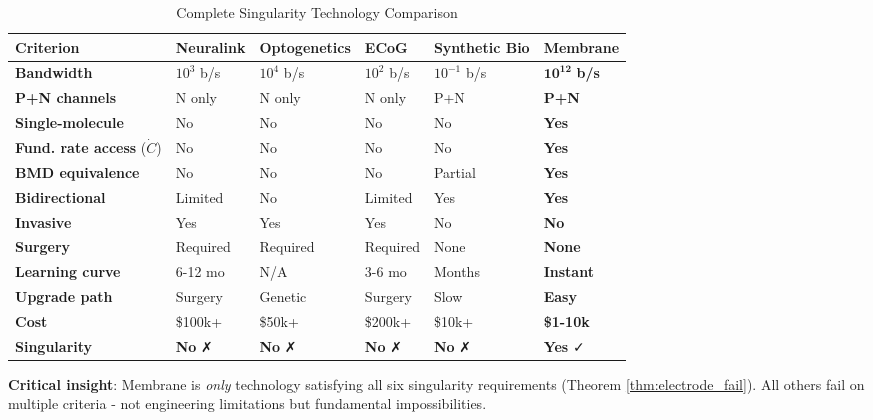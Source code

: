 \documentclass[11pt,a4paper]{article}
\theoremstyle{definition}
\theoremstyle{remark}
\begin{document}
\begin{table}[H]
\centering
\caption{Complete Singularity Technology Comparison}
\begin{tabular}{p{}|p{}|p{}|p{}|p{}|p{}}
\toprule
\textbf{Criterion} & \textbf{Neuralink} & \textbf{Optogenetics} & \textbf{ECoG} & \textbf{Synthetic Bio} & \textbf{Membrane} \\
\midrule
\textbf{Bandwidth} & $10^3$ b/s & $10^4$ b/s & $10^2$ b/s & $10^{-1}$ b/s & $\mathbf{10^{12}}$ \textbf{b/s} \\
\midrule
\textbf{P+N channels} & N only & N only & N only & P+N & \textbf{P+N} \\
\midrule
\textbf{Single-molecule} & No & No & No & No & \textbf{Yes} \\
\midrule
\textbf{Fund. rate access} ($\dot{C}$) & No & No & No & No & \textbf{Yes} \\
\midrule
\textbf{BMD equivalence} & No & No & No & Partial & \textbf{Yes} \\
\midrule
\textbf{Bidirectional} & Limited & No & Limited & Yes & \textbf{Yes} \\
\midrule
\textbf{Invasive} & Yes & Yes & Yes & No & \textbf{No} \\
\midrule
\textbf{Surgery} & Required & Required & Required & None & \textbf{None} \\
\midrule
\textbf{Learning curve} & 6-12 mo & N/A & 3-6 mo & Months & \textbf{Instant} \\
\midrule
\textbf{Upgrade path} & Surgery & Genetic & Surgery & Slow & \textbf{Easy} \\
\midrule
\textbf{Cost} & \$100k+ & \$50k+ & \$200k+ & \$10k+ & \textbf{\$1-10k} \\
\midrule
\textbf{Singularity} & \textbf{No} ✗ & \textbf{No} ✗ & \textbf{No} ✗ & \textbf{No} ✗ & \textbf{Yes} ✓ \\
\bottomrule
\end{tabular}
\end{table}

\textbf{Critical insight}: Membrane is \textit{only} technology satisfying all six singularity requirements (Theorem \ref{thm:electrode_fail}). All others fail on multiple criteria - not engineering limitations but fundamental impossibilities.
\end{document}

